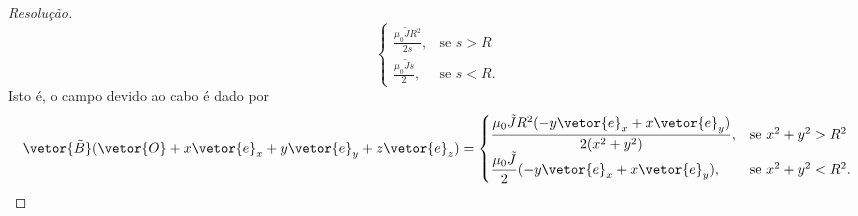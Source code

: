 \begin{proof}[Resolução]
\begin{equation*}
\begin{cases}
            \frac{\mu_0\tilde{J}R^2}{2s},&\text{se }s > R\\
            \frac{\mu_0\tilde{J}s}{2},&\text{se }s < R.
        \end{cases}
    \end{equation*}
    Isto é, o campo devido ao cabo é dado por
    \begin{equation*}
        \vetor{\tilde{B}}(\vetor{O} + x\vetor{e}_x + y \vetor{e}_y + z\vetor{e}_z) = \begin{cases}
            \displaystyle\frac{\mu_0\tilde{J}R^2(- y\vetor{e}_x + x \vetor{e}_y)}{2 (x^2 + y^2)},&\text{se }x^2 + y^2 > R^2\\
            \displaystyle\frac{\mu_0\tilde{J}}{2}( - y\vetor{e}_x + x \vetor{e}_y),&\text{se }x^2 + y^2 < R^2.
        \end{cases}
    \end{equation*}


\end{proof}

